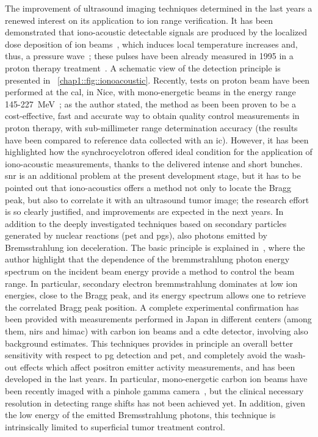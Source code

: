 The improvement of ultrasound imaging techniques  determined in the last years a renewed interest on its application to ion range verification. It has been demonstrated that iono-acoustic detectable signals are produced by the localized dose deposition of ion beams~\parencite{Tada1991}, which induces local temperature increases and, thus, a pressure wave~\parencite{Parodi2015b}; these pulses have been already measured in 1995 in a proton therapy treatment~\parencite{Hayakawa1995}.  A schematic view of the detection principle is presented in \figurename~\ref{chap1::fig::ionoacoustic}. Recently, tests on proton beam have been performed at the \gls{cal}, in Nice, with mono-energetic beams in the energy range 145-227~MeV~\parencite{Lehrack2017}; as the author stated, the method as been been proven to be a cost-effective, fast and accurate way to obtain quality control measurements in proton therapy, with sub-millimeter range determination accuracy (the results have been compared to reference data collected with an \gls{ic}). However, it has been highlighted how the synchrocyclotron offered ideal condition for the application of iono-acoustic measurements, thanks to the delivered intense and short bunches. \gls{snr} is an additional problem at the present development stage, but it has to be pointed out that iono-acoustics offers a method not only to locate the Bragg peak, but also to correlate it with an ultrasound tumor image; the research effort is so clearly justified, and improvements are expected in the next years.
In addition to the deeply investigated techniques based  on secondary particles generated by nuclear reactions (\gls{pet} and \glspl{pg}), also photons emitted by Bremsstrahlung ion deceleration. The basic principle is explained in~\cite{Yamaguchi2012}, where the author highlight that the dependence of the bremmstrahlung photon energy spectrum on the incident beam energy provide a method to control the beam range. In particular, secondary electron bremmstrahlung dominates at low ion energies, close to the Bragg peak, and its energy spectrum allows one to retrieve the correlated Bragg peak position. A complete experimental confirmation has been provided with measurements performed in Japan in different centers (among them, \gls{nirs} and \gls{himac}) with carbon ion beams and a \gls{cdte} detector, involving also background estimates. This techniques provides in principle an overall better sensitivity with respect to \gls{pg} detection and \gls{pet}, and completely avoid the wash-out effects which affect positron emitter activity measurements, and has been developed in the last years. In particular, mono-energetic carbon ion beams have been recently imaged with a pinhole gamma camera~\parencite{Yamaguchi2018}, but the clinical necessary resolution in detecting range shifts has not been achieved yet. In addition, given the low energy of the emitted Bremsstrahlung photons, this technique is intrinsically limited to superficial tumor treatment control.

